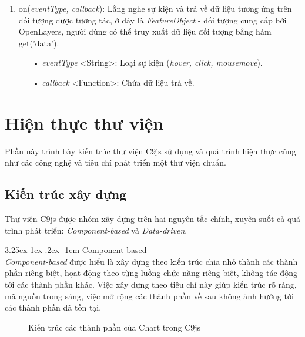 \documentclass[12pt,a4paper,twoside]{article}
\makeatletter
\newcommand*\NewPage{\newpage\null\thispagestyle{empty}\newpage}
\newcommand{\myparagraph}[1]{\paragraph{#1}\mbox{}\\} %
\renewcommand\paragraph{\@startsection{paragraph}{5}{\z@}%
  {3.25ex \@plus1ex \@minus.2ex}%
  {-1em}%
  {\normalfont\normalsize\bfseries}}
\makeatother
\begin{document}
\begin{enumerate}
\item \textsf{on(\textit{eventType, callback})}: Lắng nghe sự kiện và trả về dữ liệu tương ứng trên đối tượng được tương tác, ở đây là \textit{FeatureObject} - đối tượng cung cấp bởi OpenLayers, người dùng có thể truy xuất dữ liệu đối tượng bằng hàm \textsf{get('data')}.
	\begin{itemize}
		\item[•] \textit{eventType} <String>: Loại sự kiện (\textit{hover, click, mousemove}).
		\item[•] \textit{callback} <Function>: Chứa dữ liệu trả về.
	\end{itemize}
\end{enumerate}

\clearpage
\NewPage
\section{Hiện thực thư viện}
Phần này trình bày kiến trúc thư viện C9js sử dụng và quá trình hiện thực cũng như các công nghệ và tiêu chí phát triển một thư viện chuẩn.
\subsection{Kiến trúc xây dựng}\label{sec:kientruc}
Thư viện C9js được nhóm xây dựng trên hai nguyên tắc chính, xuyên suốt cả quá trình phát triển: \textit{Component-based} và \textit{Data-driven}.

\myparagraph{Component-based} 
\textit{Component-based}\cite{component_based} được hiểu là xây dựng theo kiến trúc chia nhỏ thành các thành phần riêng biệt, họat động theo từng luồng chức năng riêng biệt, không tác động tới các thành phần khác. Việc xây dựng theo tiêu chí này giúp kiến trúc rõ ràng, mã nguồn trong sáng, việc mở rộng các thành phần về sau không ảnh hưởng tới các thành phần đã tồn tại.

\begin{figure}[!h]
	\begin{center}
    \caption{Kiến trúc các thành phần của Chart trong C9js}
    \label{fig:chart}
	\end{center}
\end{figure}
\end{document}
